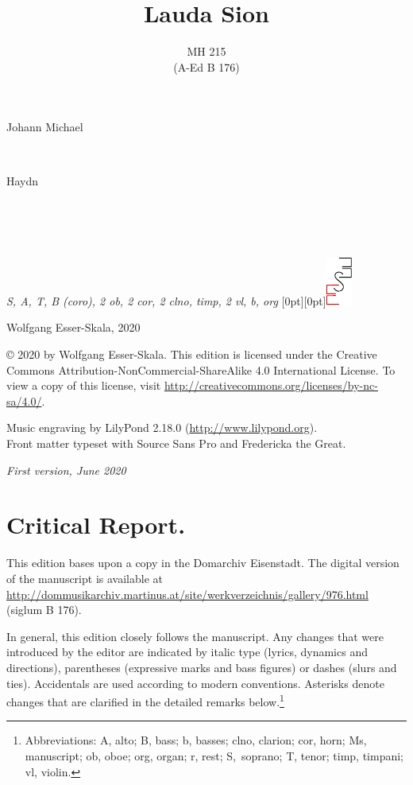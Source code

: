 \documentclass[parskip=full]{scrreprt}
\makeatletter
\DeclareRobustCommand{\sbseries}{\fontseries{sb}\selectfont}
\newcommand\fancytitlehead{
	\headingfont%
	\fontsize{80}{80}\selectfont\textcolor{black!80}{\@ifundefined{@shortname}{\@lastname}{\@shortname}.}\\[15pt]%
	\fontsize{60}{60}\selectfont\@ifundefined{@shorttitle}{\@title}{\@shorttitle}.%
}
\def\firstname#1{\def\@firstname{#1}}
\def\lastname#1{\def\@lastname{#1}}
\def\shortname#1{\def\@shortname{#1}}
\def\instrumentation#1{\def\@instrumentation{#1}}
\def\maketitle{%
\begin{titlepage}%
	\Large%
	{\@titlehead}%
	\vfill%
	{\strut\@firstname}\\%
	{\sbseries\color{oldred}\strut\@lastname}\\%
	{\strut\@namesuffix}%
	\vfill%
	{\sbseries\@title}\\%
	{\@subtitle}\\[\baselineskip]%
	{\itshape\@instrumentation}%
	\vfill%
	{\itshape\@parts}\hspace*{\fill}\raisebox{0pt}[0pt][0pt]{\includegraphics{ees_logo}}%
\end{titlepage}%
}
\newif\ifprintreport\printreportfalse
\makeatother
\begin{document}
\frenchspacing

\titlehead{\fancytitlehead}
\firstname{Johann Michael}
\lastname{Haydn}
\shortname{M. Haydn}
\title{Lauda Sion}
\subtitle{MH 215\\(A-Ed B 176)}
\instrumentation{S, A, T, B (coro), 2 ob, 2 cor, 2 clno, timp, 2 vl, b, org}
\maketitle


\thispagestyle{empty}

\vspace*{\fill}

\hspace*{1em}Wolfgang Esser-Skala, 2020

© 2020 by Wolfgang Esser-Skala. This edition is licensed under the Creative Commons Attribution-NonCommercial-ShareAlike 4.0 International License. To view a copy of this license, visit \url{http://creativecommons.org/licenses/by-nc-sa/4.0/}. 

Music engraving by LilyPond 2.18.0 (\url{http://www.lilypond.org}).\\
Front matter typeset with Source Sans Pro and Fredericka the Great.

\textit{First version, June 2020}

\vspace*{2cm}

\ifprintreport
\chapter*{Critical Report.}

This edition bases upon a copy in the Domarchiv Eisenstadt. The digital version of the manuscript is available at \url{http://dommusikarchiv.martinus.at/site/werkverzeichnis/gallery/976.html}\\ (siglum B 176).

In general, this edition closely follows the manuscript. Any changes that were introduced by the editor are indicated by italic type (lyrics, dynamics and directions), parentheses (expressive marks and bass figures) or dashes (slurs and ties). Accidentals are used according to modern conventions. Asterisks denote changes that are clarified in the detailed remarks below.\footnote{Abbreviations: A, alto; B, bass; b, basses; clno, clarion; cor, horn; Ms, manuscript; ob, oboe; org, organ; r, rest; S,~soprano; T, tenor; timp, timpani; vl, violin.}
\end{document}
